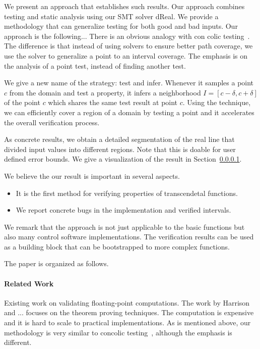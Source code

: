 We present an approach that establishes such results. Our approach combines testing and static analysis using our SMT solver dReal. We provide a methodology that can generalize testing for both good and bad inputs. Our approach is the following... There is an obvious analogy with con colic testing~\cite{}. The difference is that instead of using solvers to ensure better path coverage, we use the solver to generalize a point to an interval coverage. The emphasis is on the analysis of a point test, instead of finding another test. 

We give a new name of the strategy: test and infer. 
Whenever it samples a point $c$ from the domain and test a property,
it infers a neighborhood $I = [c - \delta, c + \delta]$ of the point $c$
which shares the same test result at point $c$. Using the technique,
we can efficiently cover a region of a domain by testing a point and
it accelerates the overall verification process.

As concrete results, we obtain a detailed segmentation of the real line that divided input values into different regions. Note that this is doable for user defined error bounds. We give a visualization of the result in Section~\ref{}. 

We believe the our result is important in several aspects. 
\begin{itemize}
\item It is the first method for verifying properties of transcendetal functions. 
\item We report concrete bugs in the implementation and verified intervals. 
\end{itemize}
We remark that the approach is not just applicable to the basic functions but also many control software implementations. The verification results can be used as a building block that can be bootstrapped to more complex functions. 

The paper is organized as follows. 

\paragraph{Related Work} Existing work on validating floating-point computations. The work by Harrison and ... focuses on the theorem proving techniques. The computation is expensive and it is hard to scale to practical implementations. As is mentioned above, our methodology is very similar to concolic testing~\cite{}, although the emphasis is different. 



